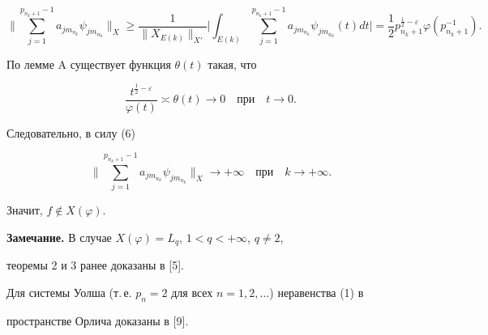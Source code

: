 \begin{pf}
\begin{equation}


\bigg\|\sum_{j=1}^{p_{n_k+1}-1}a_{jm_{n_k}}\psi_{jm_{n_k}}\bigg\|_{X} \geq 


\frac{1}{\|X_{E(k)}\|_{X'}} \bigg|\int_{E(k)}\sum_{j=1}^{p_{n_k+1}-1}


a_{jm_{n_k}}\psi_{jm_{n_k}}(t)dt\bigg|=


\frac{1}{2} p_{n_k+1}^{\frac{1}{2}-\varepsilon}


\varphi(p_{n_k+1}^{-1}).


\end{equation}


По лемме A существует функция $\theta(t)$ такая, что 


$$


\frac{t^{\frac{1}{2}-\varepsilon}}{\varphi(t)}\asymp\theta(t)\rightarrow 


0\quad \text{при}\quad t\rightarrow 0.


$$


Следовательно, в силу (6)


$$


\bigg\|\sum_{j=1}^{p_{n_k+1}-1}a_{jm_{n_k}}\psi_{jm_{n_k}}\bigg\|_{X}


\rightarrow +\infty \quad \text{при} \quad k\rightarrow+\infty.


$$





Значит, $f\notin X(\varphi)$.


\end{pf}





{\bf Замечание.} В случае $X(\varphi)=L_{q}$, $1<q<+\infty$, $q\neq 2$, 


теоремы 2 и 3 ранее доказаны в [5].


Для системы Уолша (т.\,е. $p_n=2$ для всех $n=1,2,\dotsc$) неравенства (1) в 


пространстве Орлича доказаны в [9].









